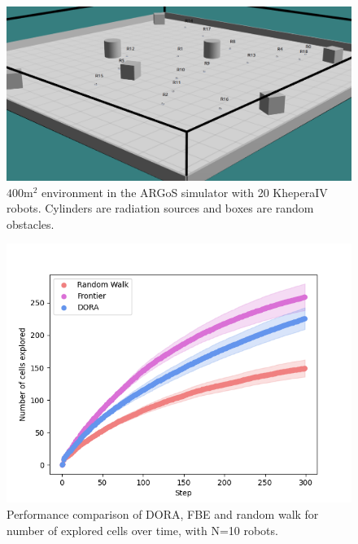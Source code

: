 \begin{figure}[h]
	\centering
    \includegraphics[width=0.99\columnwidth]{images/argos.png}
    \caption{$400 \text{m}^2$ environment in the ARGoS simulator with 20 KheperaIV robots. Cylinders are radiation sources and boxes are random obstacles.}
    \label{argos}
\end{figure}

\label{annexe: results}

\begin{figure}[h]
	\centering
    \includegraphics[width=0.99\columnwidth]{images/explored_10.png}
    \caption{Performance comparison of DORA, FBE and random walk for number of explored cells over time, with N=10 robots.}
    \label{results:explored10}
\end{figure}

